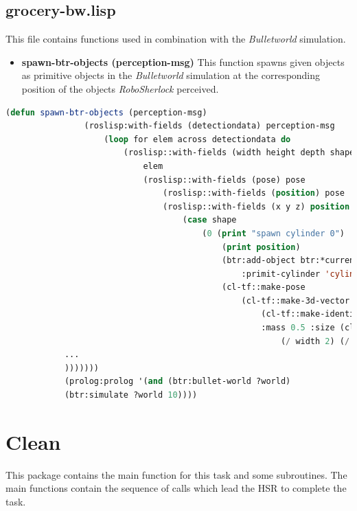 \documentclass[main.tex]{subfiles}
\begin{document}
        \subsection{grocery-bw.lisp}
        This file contains functions used in combination with the \textit{Bulletworld} simulation.
        \begin{itemize}
            \item \textbf{spawn-btr-objects (perception-msg)}
            This function spawns given objects as primitive objects in the \textit{Bulletworld} simulation at the corresponding position of the objects \textit{RoboSherlock} perceived.  
        \end{itemize}
        \begin{lstlisting}[language=lisp]
            (defun spawn-btr-objects (perception-msg)
                (roslisp:with-fields (detectiondata) perception-msg
                    (loop for elem across detectiondata do
                        (roslisp::with-fields (width height depth shape pose) 
                            elem
                            (roslisp::with-fields (pose) pose
                                (roslisp::with-fields (position) pose
                                (roslisp::with-fields (x y z) position 
                                    (case shape
                                        (0 (print "spawn cylinder 0")
                                            (print position)
                                            (btr:add-object btr:*current-bullet-world* 
                                                :primit-cylinder 'cylinder-0 
                                            (cl-tf::make-pose 
                                                (cl-tf::make-3d-vector x y z)
                                                    (cl-tf::make-identity-rotation))
                                                    :mass 0.5 :size (cl-tf:make-3d-vector 
                                                        (/ width 2) (/ depth 2) (/ height 2))))
            ...
            )))))))
            (prolog:prolog '(and (btr:bullet-world ?world)
            (btr:simulate ?world 10))))
        \end{lstlisting}
          \section{Clean}
          \label{clean}
          This package contains the main function for this task and some subroutines. The main functions contain the sequence of calls which lead the HSR to complete the task.
\end{document}
